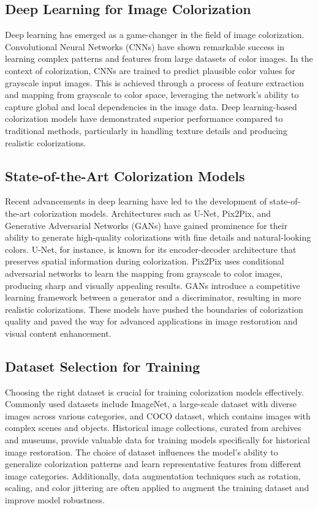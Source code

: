 \subsection*{Deep Learning for Image Colorization}
Deep learning has emerged as a game-changer in the field of image colorization. Convolutional Neural Networks (CNNs) have shown remarkable success in learning complex patterns and features from large datasets of color images. In the context of colorization, CNNs are trained to predict plausible color values for grayscale input images. This is achieved through a process of feature extraction and mapping from grayscale to color space, leveraging the network's ability to capture global and local dependencies in the image data. Deep learning-based colorization models have demonstrated superior performance compared to traditional methods, particularly in handling texture details and producing realistic colorizations.

\subsection*{State-of-the-Art Colorization Models}
Recent advancements in deep learning have led to the development of state-of-the-art colorization models. Architectures such as U-Net, Pix2Pix, and Generative Adversarial Networks (GANs) have gained prominence for their ability to generate high-quality colorizations with fine details and natural-looking colors. U-Net, for instance, is known for its encoder-decoder architecture that preserves spatial information during colorization. Pix2Pix uses conditional adversarial networks to learn the mapping from grayscale to color images, producing sharp and visually appealing results. GANs introduce a competitive learning framework between a generator and a discriminator, resulting in more realistic colorizations. These models have pushed the boundaries of colorization quality and paved the way for advanced applications in image restoration and visual content enhancement.

\subsection*{Dataset Selection for Training}

Choosing the right dataset is crucial for training colorization models effectively. Commonly used datasets include ImageNet, a large-scale dataset with diverse images across various categories, and COCO dataset, which contains images with complex scenes and objects. Historical image collections, curated from archives and museums, provide valuable data for training models specifically for historical image restoration. The choice of dataset influences the model's ability to generalize colorization patterns and learn representative features from different image categories. Additionally, data augmentation techniques such as rotation, scaling, and color jittering are often applied to augment the training dataset and improve model robustness.

